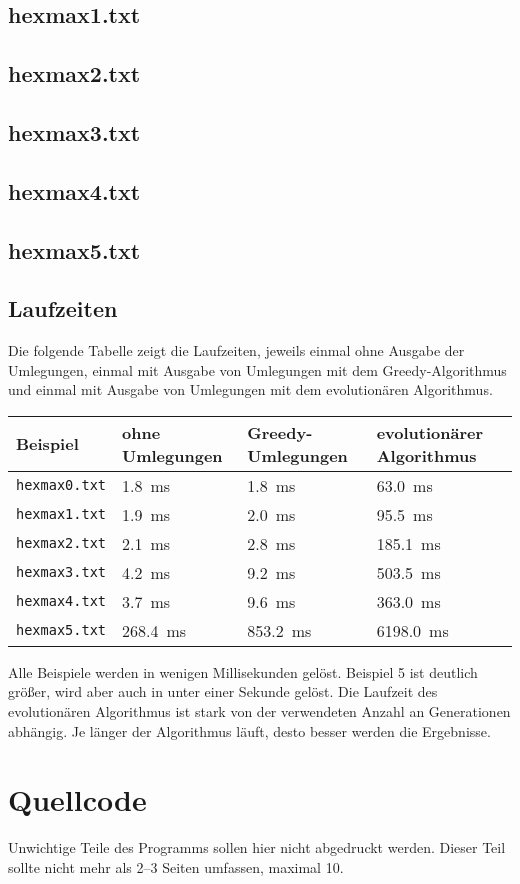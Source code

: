 \documentclass[a4paper,10pt,ngerman]{scrartcl}
\begin{document}
\subsection*{hexmax1.txt}

\subsection*{hexmax2.txt}

\subsection*{hexmax3.txt}

\subsection*{hexmax4.txt}

\subsection*{hexmax5.txt}


\subsection{Laufzeiten}
Die folgende Tabelle zeigt die Laufzeiten, jeweils einmal ohne Ausgabe der Umlegungen, einmal mit Ausgabe von Umlegungen mit dem Greedy-Algorithmus und einmal mit Ausgabe von Umlegungen mit dem evolutionären Algorithmus.
\begin{table}[H]
    \centering
    \begin{tabular}{llll}
        \toprule
        Beispiel & ohne  Umlegungen &  Greedy-Umlegungen & evolutionärer Algorithmus\\ \midrule
        \texttt{hexmax0.txt} & \SI{1.8}{\milli\second} & \SI{1.8}{\milli\second} &  \SI{  63.0}{\milli\second}\\
        \texttt{hexmax1.txt} & \SI{1.9}{\milli\second} & \SI{2.0}{\milli\second}&   \SI{  95.5}{\milli\second}\\
        \texttt{hexmax2.txt} & \SI{2.1}{\milli\second} & \SI{2.8}{\milli\second}&   \SI{ 185.1}{\milli\second}\\
        \texttt{hexmax3.txt} & \SI{4.2}{\milli\second} & \SI{9.2}{\milli\second}&   \SI{ 503.5}{\milli\second} \\
        \texttt{hexmax4.txt} & \SI{3.7}{\milli\second} & \SI{9.6}{\milli\second}&   \SI{ 363.0}{\milli\second} \\
        \texttt{hexmax5.txt} & \SI{268.4}{\milli\second} & \SI{853.2}{\milli\second}& \SI{6198.0}{\milli\second}\\
        \bottomrule
    \end{tabular}
\end{table}
Alle Beispiele werden in wenigen Millisekunden gelöst. Beispiel 5 ist deutlich größer, wird aber auch in unter einer Sekunde gelöst. 
Die Laufzeit des evolutionären Algorithmus ist stark von der verwendeten Anzahl an Generationen abhängig. Je länger der Algorithmus läuft, desto besser werden die Ergebnisse.
\section{Quellcode}
Unwichtige Teile des Programms sollen hier nicht abgedruckt werden. Dieser Teil sollte nicht mehr als 2–3 Seiten umfassen, maximal 10.
\end{document}
